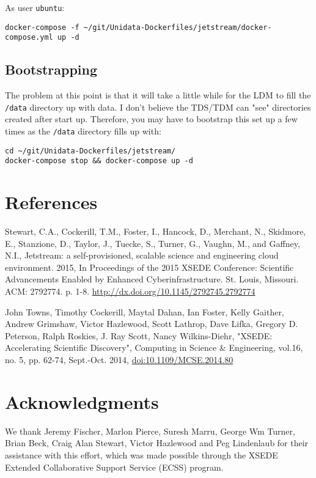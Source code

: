 \documentclass[onecolumn,9pt]{article}
\begin{document}
As user \texttt{ubuntu}:

\begin{verbatim}
docker-compose -f ~/git/Unidata-Dockerfiles/jetstream/docker-compose.yml up -d
\end{verbatim}

\subsection{Bootstrapping}
\label{sec:orgheadline33}

The problem at this point is that it will take a little while for the LDM to fill the \texttt{/data} directory up with data. I don't believe the TDS/TDM can "see" directories created after start up. Therefore, you may have to bootstrap this set up a few times as the \texttt{/data} directory fills up with:

\begin{verbatim}
cd ~/git/Unidata-Dockerfiles/jetstream/
docker-compose stop && docker-compose up -d
\end{verbatim}

\section{References}
\label{sec:orgheadline35}

Stewart, C.A., Cockerill, T.M., Foster, I., Hancock, D., Merchant, N., Skidmore, E., Stanzione, D., Taylor, J., Tuecke, S., Turner, G., Vaughn, M., and Gaffney, N.I., Jetstream: a self-provisioned, scalable science and engineering cloud environment. 2015, In Proceedings of the 2015 XSEDE Conference: Scientific Advancements Enabled by Enhanced Cyberinfrastructure. St. Louis, Missouri. ACM: 2792774. p. 1-8. \url{http://dx.doi.org/10.1145/2792745.2792774}

John Towns, Timothy Cockerill, Maytal Dahan, Ian Foster, Kelly Gaither, Andrew Grimshaw, Victor Hazlewood, Scott Lathrop, Dave Lifka, Gregory D. Peterson, Ralph Roskies, J. Ray Scott, Nancy Wilkins-Diehr, "XSEDE: Accelerating Scientific Discovery", Computing in Science \& Engineering, vol.16, no. 5, pp. 62-74, Sept.-Oct. 2014, \url{doi:10.1109/MCSE.2014.80}

\section{Acknowledgments}
\label{sec:orgheadline36}

We thank Jeremy Fischer, Marlon Pierce, Suresh Marru, George Wm Turner, Brian Beck, Craig Alan Stewart, Victor Hazlewood and Peg Lindenlaub for their assistance with this effort, which was made possible through the XSEDE Extended Collaborative Support Service (ECSS) program.
\end{document}
